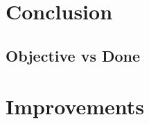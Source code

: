 \documentclass{eplmastersthesis}
\begin{document}
  \chapter{Conclusion}

    \section{Objective vs Done}

    \section{}

  \chapter{Improvements}


  \nocite{*}
  
  




  \backcoverpage
\end{document}
